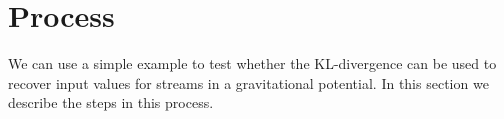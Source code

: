 \documentclass{emulateapj}
\begin{document}


\section{Process}
\label{sec:process}

We can use a simple example to test whether the KL-divergence can be used to recover input values for streams in a gravitational potential. In this section we describe the steps in this process. 
\end{document}
